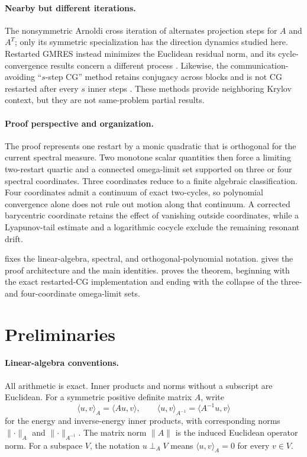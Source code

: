 \documentclass[11pt]{article}
\begin{document}
\paragraph{Nearby but different iterations.}
The nonsymmetric Arnoldi cross iteration of
\cite{FaberLiesenTichy2023} alternates projection steps for \(A\) and
\(A^T\); only its symmetric specialization has the direction dynamics
studied here.  Restarted GMRES instead minimizes the Euclidean residual
norm, and its cycle-convergence results concern a different process
\cite{SaadSchultz1986,VecharynskiLangou2010}.  Likewise, the
communication-avoiding ``\(s\)-step CG'' method retains conjugacy across
blocks and is not CG restarted after every \(s\) inner steps
\cite{ChronopoulosGear1989}.  These methods provide neighboring Krylov
context, but they are not same-problem partial results.

\paragraph{Proof perspective and organization.}
The proof represents one restart by a monic quadratic that is orthogonal
for the current spectral measure.  Two monotone scalar quantities then
force a limiting two-restart quartic and a connected omega-limit set
supported on three or four spectral coordinates.  Three coordinates reduce
to a finite algebraic classification.  Four coordinates admit a continuum
of exact two-cycles, so polynomial convergence alone does not rule out
motion along that continuum.  A corrected barycentric coordinate retains
the effect of vanishing outside coordinates, while a Lyapunov-tail estimate
and a logarithmic cocycle exclude the remaining resonant drift.

 fixes the linear-algebra, spectral, and
orthogonal-polynomial notation.   gives the proof
architecture and the main identities.   proves the
theorem, beginning with the exact restarted-CG implementation and ending
with the collapse of the three- and four-coordinate omega-limit sets.

\section{Preliminaries}
\label{sec:preliminaries}

\paragraph{Linear-algebra conventions.}
All arithmetic is exact.  Inner products and norms without a subscript are
Euclidean.  For a symmetric positive definite matrix \(A\), write
\[
 \langle u,v\rangle_A=\langle Au,v\rangle,\qquad
 \langle u,v\rangle_{A^{-1}}=\langle A^{-1}u,v\rangle
\]
for the energy and inverse-energy inner products, with corresponding norms
\(\lVert\cdot\rVert_A\) and \(\lVert\cdot\rVert_{A^{-1}}\).  The matrix
norm \(\lVert A\rVert\) is the induced Euclidean operator norm.  For a
subspace \(V\), the notation \(u\perp_A V\) means
\(\langle u,v\rangle_A=0\) for every \(v\in V\).
\end{document}
